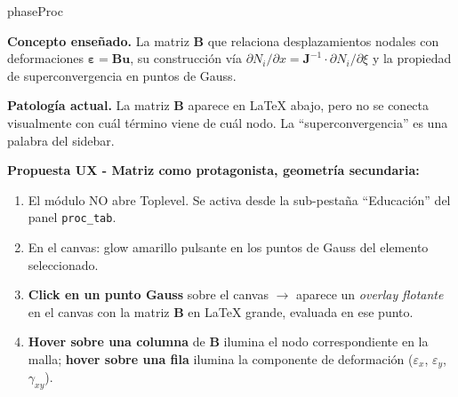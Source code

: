 \documentclass[11pt,a4paper]{article}
\begin{document}
\begin{moduleBox}{phaseProc}

\textbf{Concepto enseñado.} La matriz $\mathbf{B}$ que relaciona
desplazamientos nodales con deformaciones $\boldsymbol{\varepsilon} =
\mathbf{B}\mathbf{u}$, su construcción vía
$\partial N_i / \partial x = \mathbf{J}^{-1} \cdot \partial N_i / \partial \xi$
y la propiedad de superconvergencia en puntos de Gauss.

\textbf{Patología actual.} La matriz $\mathbf{B}$ aparece en LaTeX abajo,
pero no se conecta visualmente con cuál término viene de cuál nodo. La
``superconvergencia'' es una palabra del sidebar.

\textbf{Propuesta UX - Matriz como protagonista, geometría secundaria:}
\begin{enumerate}[leftmargin=1.2em, itemsep=2pt]
  \item El módulo NO abre Toplevel. Se activa desde la sub-pestaña
        ``Educación'' del panel \texttt{proc\_tab}.
  \item En el canvas: glow amarillo pulsante en los puntos de Gauss del
        elemento seleccionado.
  \item \textbf{Click en un punto Gauss} sobre el canvas $\rightarrow$
        aparece un \emph{overlay flotante} en el canvas con la matriz
        $\mathbf{B}$ en LaTeX grande, evaluada en ese punto.
  \item \textbf{Hover sobre una columna} de $\mathbf{B}$ ilumina el nodo
        correspondiente en la malla; \textbf{hover sobre una fila} ilumina
        la componente de deformación ($\varepsilon_x$, $\varepsilon_y$,
        $\gamma_{xy}$).
\end{enumerate}

\begin{center}
\end{center}
\end{moduleBox}
\end{document}
